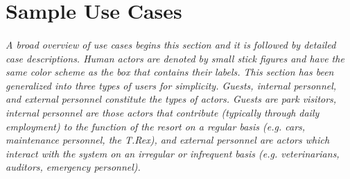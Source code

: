 \documentclass[12pt]{article}
\begin{document}
\section{Sample Use Cases} \label{samp}
\paragraph{} \textit{A broad overview of use cases begins this section and it is followed 
by detailed case descriptions. Human actors are denoted by small stick figures and have the 
same color scheme as the box that contains their labels. This section has been generalized into
three types of users for simplicity. Guests, internal personnel, and external personnel constitute
the types of actors. Guests are park visitors, internal personnel are those actors that contribute 
(typically through daily employment) to the function of the resort on a regular basis (e.g. cars, 
maintenance personnel, the T.Rex), and external personnel are actors which interact with the system
on an irregular or infrequent basis (e.g. veterinarians, auditors, emergency personnel).}
\pagebreak
\end{document}
